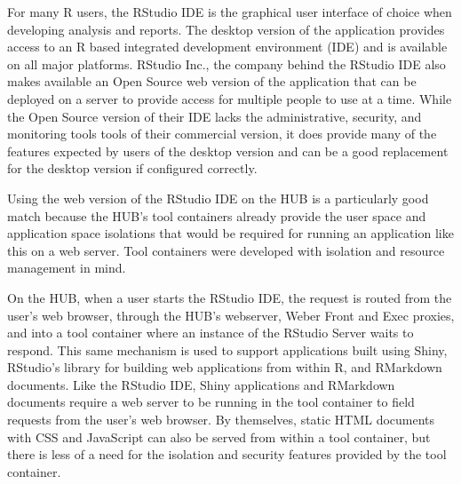 \documentclass[conference]{../sty/IEEEtran}
\begin{document}
For many R users, the RStudio IDE is the graphical user interface of choice
when developing analysis and reports. The desktop version of the application
provides access to an R based integrated development environment (IDE) and is
available on all major platforms. RStudio Inc., the company behind the RStudio
IDE also makes available an Open Source web version of the application that can
be deployed on a server to provide access for multiple people to use at a time.
While the Open Source version of their IDE lacks the administrative, security,
and monitoring tools tools of their commercial version, it does provide many of
the features expected by users of the desktop version and can be a good
replacement for the desktop version if configured correctly.

Using the web version of the RStudio IDE on the HUB is a particularly good
match because the HUB's tool containers already provide the user space and
application space isolations that would be required for running an application
like this on a web server. Tool containers were developed with isolation and
resource management in mind.

On the HUB, when a user starts the RStudio IDE, the request is routed from the
user's web browser, through the HUB's webserver, Weber Front and Exec proxies,
and into a tool container where an instance of the RStudio Server waits to
respond. This same mechanism is used to support applications built using
Shiny, RStudio's library for building web applications from within R, and
RMarkdown documents. Like the RStudio IDE, Shiny applications and RMarkdown
documents require a web server to be running in the tool container to field
requests from the user's web browser. By themselves, static HTML documents with
CSS and JavaScript can also be served from within a tool container, but there
is less of a need for the isolation and security features provided by the tool
container.



\end{document}
